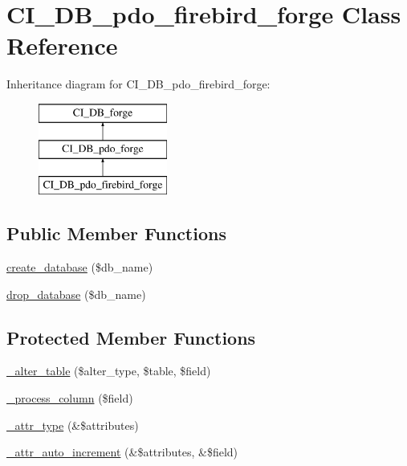 \hypertarget{class_c_i___d_b__pdo__firebird__forge}{}\section{C\+I\+\_\+\+D\+B\+\_\+pdo\+\_\+firebird\+\_\+forge Class Reference}
\label{class_c_i___d_b__pdo__firebird__forge}
Inheritance diagram for C\+I\+\_\+\+D\+B\+\_\+pdo\+\_\+firebird\+\_\+forge\+:\begin{figure}[H]
\begin{center}
\leavevmode
\includegraphics[height=3.000000cm]{class_c_i___d_b__pdo__firebird__forge}
\end{center}
\end{figure}
\subsection*{Public Member Functions}
\begin{DoxyCompactItemize}
\item 
\mbox{\hyperlink{class_c_i___d_b__pdo__firebird__forge_a902a7267babceb2ce595706f217e00ad}{create\+\_\+database}} (\$db\+\_\+name)
\item 
\mbox{\hyperlink{class_c_i___d_b__pdo__firebird__forge_a9612987b2d4230de2638d15857e92e67}{drop\+\_\+database}} (\$db\+\_\+name)
\end{DoxyCompactItemize}
\subsection*{Protected Member Functions}
\begin{DoxyCompactItemize}
\item 
\mbox{\hyperlink{class_c_i___d_b__pdo__firebird__forge_a41c6cae02f2fda8b429ad0afb9509426}{\+\_\+alter\+\_\+table}} (\$alter\+\_\+type, \$table, \$field)
\item 
\mbox{\hyperlink{class_c_i___d_b__pdo__firebird__forge_a8f38f1c5b5dddecca4befbe393f3f299}{\+\_\+process\+\_\+column}} (\$field)
\item 
\mbox{\hyperlink{class_c_i___d_b__pdo__firebird__forge_a8553be952084c6f7cdfff370a1d14f6b}{\+\_\+attr\+\_\+type}} (\&\$attributes)
\item 
\mbox{\hyperlink{class_c_i___d_b__pdo__firebird__forge_a2a013a5932439c3c44f0dad3436525f7}{\+\_\+attr\+\_\+auto\+\_\+increment}} (\&\$attributes, \&\$field)
\end{DoxyCompactItemize}
